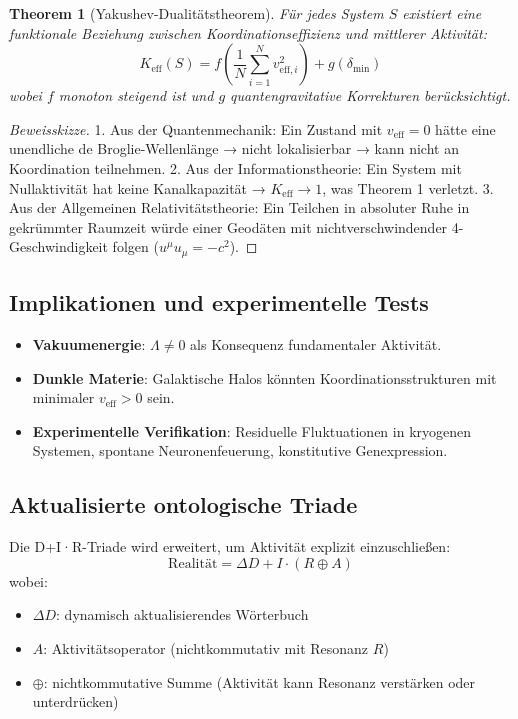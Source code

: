 \documentclass[11pt,a4paper]{article}
\newtheorem{theorem}{Theorem}
\begin{document}
	\begin{theorem}[Yakushev-Dualitätstheorem]
		Für jedes System $S$ existiert eine funktionale Beziehung zwischen Koordinationseffizienz und mittlerer Aktivität:
		\[
		K_{\mathrm{eff}}(S) = f\left( \frac{1}{N}\sum_{i=1}^N v_{\mathrm{eff},i}^2 \right) + g(\delta_{\min})
		\]
		wobei $f$ monoton steigend ist und $g$ quantengravitative Korrekturen berücksichtigt.
	\end{theorem}
	
	\begin{proof}[Beweisskizze]
		1. Aus der Quantenmechanik: Ein Zustand mit $v_{\mathrm{eff}} = 0$ hätte eine unendliche de Broglie-Wellenlänge → nicht lokalisierbar → kann nicht an Koordination teilnehmen.
		2. Aus der Informationstheorie: Ein System mit Nullaktivität hat keine Kanalkapazität → $K_{\mathrm{eff}} \to 1$, was Theorem 1 verletzt.
		3. Aus der Allgemeinen Relativitätstheorie: Ein Teilchen in absoluter Ruhe in gekrümmter Raumzeit würde einer Geodäten mit nichtverschwindender 4-Geschwindigkeit folgen ($u^\mu u_\mu = -c^2$).
	\end{proof}
	
	\subsection{Implikationen und experimentelle Tests}
	
	\begin{itemize}
		\item \textbf{Vakuumenergie}: $\Lambda \neq 0$ als Konsequenz fundamentaler Aktivität.
		\item \textbf{Dunkle Materie}: Galaktische Halos könnten Koordinationsstrukturen mit minimaler $v_{\mathrm{eff}} > 0$ sein.
		\item \textbf{Experimentelle Verifikation}: Residuelle Fluktuationen in kryogenen Systemen, spontane Neuronenfeuerung, konstitutive Genexpression.
	\end{itemize}
	
	\subsection{Aktualisierte ontologische Triade}
	
	Die D+I·R-Triade wird erweitert, um Aktivität explizit einzuschließen:
	\[
	\boxed{\mathrm{Realität} = \Delta D + I \cdot (R \oplus A)}
	\]
	wobei:
	\begin{itemize}
		\item $\Delta D$: dynamisch aktualisierendes Wörterbuch
		\item $A$: Aktivitätsoperator (nichtkommutativ mit Resonanz $R$)
		\item $\oplus$: nichtkommutative Summe (Aktivität kann Resonanz verstärken oder unterdrücken)
	\end{itemize}
	
\end{document}
